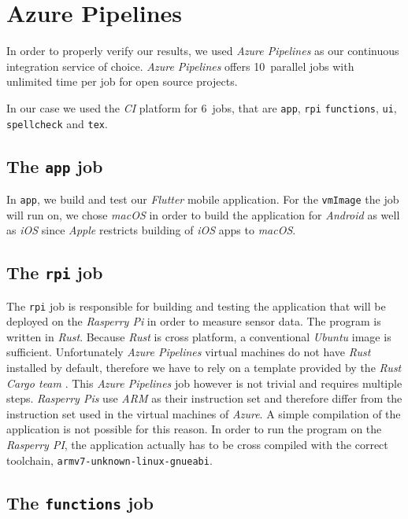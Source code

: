 \section{Azure Pipelines}

In order to properly verify our results, we used \textit{Azure Pipelines} as our continuous
integration service of choice. \textit{Azure Pipelines} offers 10~parallel jobs with unlimited time
per job for open source projects. \cite{azure-pipelines-devop}

In our case we used the \textit{CI} platform for 6~jobs, that are \texttt{app}, \texttt{rpi}
\texttt{functions}, \texttt{ui}, \texttt{spellcheck} and \texttt{tex}.

\subsection{The \texttt{app} job}

In \texttt{app}, we build and test our \textit{Flutter} mobile application. For the \texttt{vmImage}
the job will run on, we chose \textit{macOS} in order to build the application for \textit{Android}
as well as \textit{iOS} since \textit{Apple} restricts building of \textit{iOS} apps to
\textit{macOS}.

\subsection{The \texttt{rpi} job}

The \texttt{rpi} job is responsible for building and testing the application that will be deployed
on the \textit{Rasperry Pi} in order to measure sensor data. The program is written in
\textit{Rust}. Because \textit{Rust} is cross platform, a conventional \textit{Ubuntu} image is
sufficient. Unfortunately \textit{Azure Pipelines} virtual machines do not have \textit{Rust}
installed by default, therefore we have to rely on a template provided by the \textit{Rust Cargo
team} \cite{rust-cargo}. This \textit{Azure Pipelines} job however is not trivial and requires
multiple steps. \textit{Rasperry Pis} use \textit{ARM} as their instruction set and therefore differ
from the instruction set used in the virtual machines of \textit{Azure}. A simple compilation of the
application is not possible for this reason. In order to run the program on the \textit{Rasperry
PI}, the application actually has to be cross compiled with the correct toolchain,
\texttt{armv7-unknown-linux-gnueabi}.

\subsection{The \texttt{functions} job}
\label{sec:azure-function}

